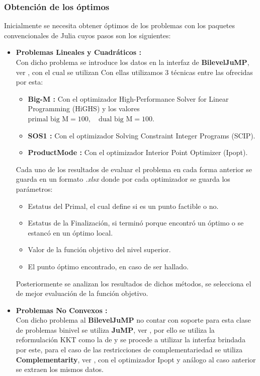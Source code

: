 \subsubsection{Obtención de los óptimos}
Inicialmente se necesita obtener óptimos de los problemas con los paquetes convencionales de Julia
cuyos pasos son los siguientes:
\begin{itemize}
    \item \textbf{Problemas Lineales y Cuadráticos :}\\
            Con dicho problema se introduce los datos en la interfaz de \textbf{BilevelJuMP}, ver \cite{BilevelJump}, con el cual se utilizan
            Con ellas utilizamos 3 técnicas entre las ofrecidas por esta:
            \begin{itemize}
                \item \textbf{Big-M :} Con el optimizador High-Performance Solver for Linear Programming (HiGHS) y los valores $\text{primal big M} = 100, \quad \text{dual big M} = 100$.
                \item \textbf{SOS1 :} Con el optimizador Solving Constraint Integer Programs (SCIP).
                \item \textbf{ProductMode :} Con el optimizador Interior Point Optimizer (Ipopt).
            \end{itemize} 
            Cada uno de los resultados de evaluar el problema en cada forma anterior se guarda en un formato \textit{.xlsx}
            donde por cada optimizador se guarda los parámetros:
            \begin{itemize}
                \item Estatus del Primal, el cual define si es un punto factible o no.
                \item Estatus de la Finalización, si terminó porque encontró un óptimo o se estancó en un óptimo local.
                \item Valor de la función objetivo del nivel superior.
                \item El punto óptimo encontrado, en caso de ser hallado.
            \end{itemize} 
            Posteriormente se analizan los resultados de dichos métodos, se selecciona el de mejor evaluación de la función objetivo.
    \item \textbf{Problemas No Convexos :}\\
            Con dicho problema al \textbf{BilevelJuMP} no contar con soporte para esta clase de problemas binivel se utiliza \textbf{JuMP}, ver \cite{JuMPPaper}, 
            por ello se utiliza la reformulación KKT como la de  y se procede a utilizar la interfaz brindada por este, para el caso de las restricciones de 
            complementariedad se utiliza \textbf{Complementarity}, ver \cite{Complementarityjl}, con el optimizador Ipopt y análogo al caso anterior se extraen los mismos datos.
\end{itemize}


